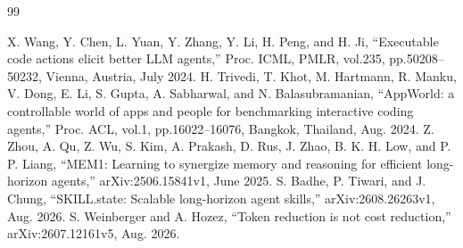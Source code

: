 \begin{thebibliography}{99}
\raggedright
{} X. Wang, Y. Chen, L. Yuan, Y. Zhang, Y. Li, H. Peng, and H. Ji, ``Executable code actions elicit better LLM agents,'' Proc. ICML, PMLR, vol.235, pp.50208--50232, Vienna, Austria, July 2024.
 H. Trivedi, T. Khot, M. Hartmann, R. Manku, V. Dong, E. Li, S. Gupta, A. Sabharwal, and N. Balasubramanian, ``AppWorld: a controllable world of apps and people for benchmarking interactive coding agents,'' Proc. ACL, vol.1, pp.16022--16076, Bangkok, Thailand, Aug. 2024.
 Z. Zhou, A. Qu, Z. Wu, S. Kim, A. Prakash, D. Rus, J. Zhao, B. K. H. Low, and P. P. Liang, ``MEM1: Learning to synergize memory and reasoning for efficient long-horizon agents,'' arXiv:2506.15841v1, June 2025.
 S. Badhe, P. Tiwari, and J. Chung, ``SKILL.state: Scalable long-horizon agent skills,'' arXiv:2608.26263v1, Aug. 2026.
 S. Weinberger and A. Hozez, ``Token reduction is not cost reduction,'' arXiv:2607.12161v5, Aug. 2026.
\end{thebibliography}
